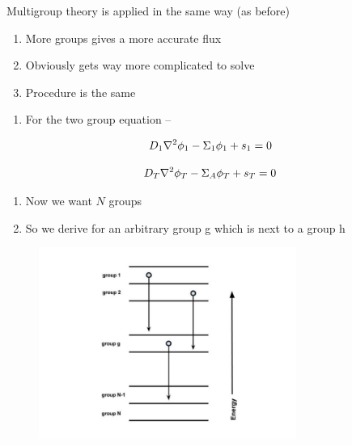 \documentclass[aspectratio=1610,pdftex,dvipsnames,compress,xcolor={dvipsnames}]{beamer}
\begin{document}
\addtocounter{framenumber}{-1} 
\begin{frame}{Multigroup theory is applied in the same way (as before)}
    \begin{enumerate}[series=outerlist,topsep=0pt,itemsep=21pt,leftmargin=*,label=(\arabic*)]
        \item[]More groups gives a more accurate flux 
        \item[]Obviously gets way more complicated to solve  
        \item[]Procedure is the same
    \end{enumerate}

    \vspace*{\fill}

    \begin{enumerate}[series=outerlist,topsep=7pt,itemsep=0pt,leftmargin=*,label=(\arabic*)]
        \item[]For the two group equation --
    \end{enumerate}

    \begin{equation}
        \LARGE
        D_1 \nabla^2 \phi_1 -\Sigma_1 \phi_1 + s_1=0
    \end{equation}

    \begin{equation}
        \LARGE
        D_T \nabla^2 \phi_T -\Sigma_A \phi_T + s_T=0
    \end{equation}

    \vspace*{\fill}

    \begin{enumerate}[series=outerlist,topsep=0pt,itemsep=21pt,leftmargin=*,label=(\arabic*)]
        \item[]Now we want $N$ groups
        \item[]So we derive for an arbitrary group g which is next to a group h
    \end{enumerate}
\end{frame}


\begin{frame}{}
    \begin{figure}
        \centering
        \includegraphics[width=0.75\textwidth]{groups.jpg}
    \end{figure}
\end{frame}
\end{document}
